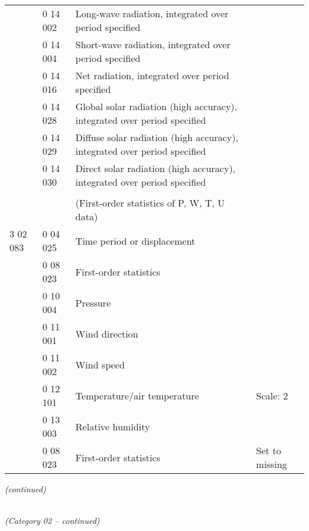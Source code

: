 \begin{longtable}[]{@{}llll@{}}
& 0 14 002 & Long-wave radiation, integrated over period specified &\tabularnewline
& 0 14 004 & Short-wave radiation, integrated over period specified &\tabularnewline
& 0 14 016 & Net radiation, integrated over period specified &\tabularnewline
& 0 14 028 & Global solar radiation (high accuracy), integrated over period specified &\tabularnewline
& 0 14 029 & Diffuse solar radiation (high accuracy), integrated over period specified &\tabularnewline
& 0 14 030 & Direct solar radiation (high accuracy), integrated over period specified &\tabularnewline
& & &\tabularnewline
& & (First-order statistics of P, W, T, U data) &\tabularnewline
3 02 083 & 0 04 025 & Time period or displacement &\tabularnewline
& 0 08 023 & First-order statistics &\tabularnewline
& 0 10 004 & Pressure &\tabularnewline
& 0 11 001 & Wind direction &\tabularnewline
& 0 11 002 & Wind speed &\tabularnewline
& 0 12 101 & Temperature/air temperature & Scale: 2\tabularnewline
& 0 13 003 & Relative humidity &\tabularnewline
& 0 08 023 & First-order statistics & Set to missing\tabularnewline
\bottomrule
\end{longtable}

\emph{(continued)}

\emph{\\
(Category 02 -- continued)}

